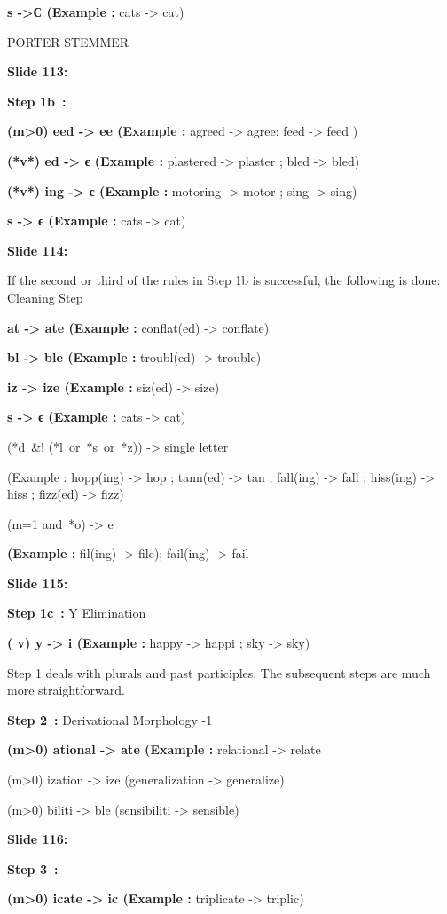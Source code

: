 \documentclass[11pt,a4paper]{article}
\begin{document}
\textbf{s ->Є (Example :}  cats -> cat)

PORTER STEMMER

\textbf{Slide 113:}

\textbf{Step 1b :} 

\textbf{(m>0) eed -> ee (Example :}  agreed -> agree; feed -> feed )

\textbf{(*v*) ed -> є (Example :}  plastered -> plaster ; bled -> bled)

\textbf{(*v*) ing -> є (Example :}  motoring -> motor ; sing -> sing)

\textbf{s -> є (Example :}  cats -> cat)

\textbf{Slide 114:}

If the second or third of the rules in Step 1b is successful, the following is done: Cleaning Step

\textbf{at -> ate (Example :}  conflat(ed) -> conflate)

\textbf{bl -> ble (Example :}  troubl(ed) -> trouble)

\textbf{iz -> ize (Example :}  siz(ed) -> size)

\textbf{s -> є (Example :}  cats -> cat)

(*d &! (*l or *s or *z)) -> single letter

(Example : hopp(ing) -> hop ; tann(ed) -> tan ; fall(ing) -> fall ; hiss(ing) -> hiss ; fizz(ed) -> fizz)

(m=1 and *o) -> e

\textbf{(Example :}  fil(ing) -> file); fail(ing) -> fail

\textbf{Slide 115:}

\textbf{Step 1c :}  Y Elimination

\textbf{( \*v\*) y -> i (Example :}  happy -> happi ; sky -> sky)

Step 1 deals with plurals and past participles. The subsequent steps are much more straightforward.

\textbf{Step 2 :} Derivational Morphology -1

\textbf{(m>0) ational -> ate (Example :}  relational -> relate

(m>0) ization -> ize (generalization -> generalize)

(m>0) biliti -> ble (sensibiliti -> sensible)

\textbf{Slide 116:}

\textbf{Step 3 :} 

\textbf{(m>0) icate -> ic (Example :}  triplicate -> triplic)
\end{document}
